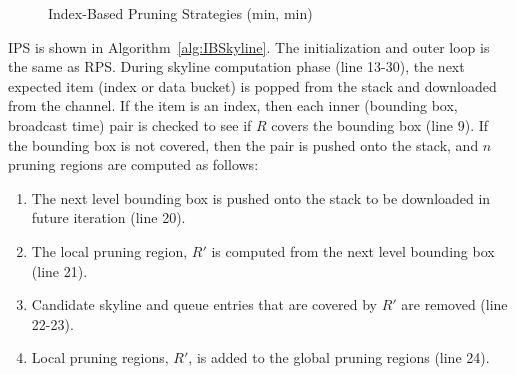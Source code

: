 \begin{figure}[h]
  \centering
  \caption{Index-Based Pruning Strategies (min, min)}
  \label{fig:ibp}
\end{figure}

IPS is shown in Algorithm~\ref{alg:IBSkyline}. The initialization and outer loop is the same as RPS. During skyline computation phase (line 13-30), the next expected item (index or data bucket) is popped from the stack and downloaded from the channel. If the item is an index, then each inner (bounding box, broadcast time) pair is checked to see if $R$ covers the bounding box (line 9). If the bounding box is not covered, then the pair is pushed onto the stack, and $n$ pruning regions are computed as follows:

\begin{enumerate}
\item The next level bounding box is pushed onto the stack to be downloaded in future iteration (line 20).
\item The local pruning region, $R'$ is computed from the next level bounding box (line 21).
\item Candidate skyline and queue entries that are covered by $R'$ are removed (line 22-23).
\item Local pruning regions, $R'$, is added to the global pruning regions (line 24).
\end{enumerate}

